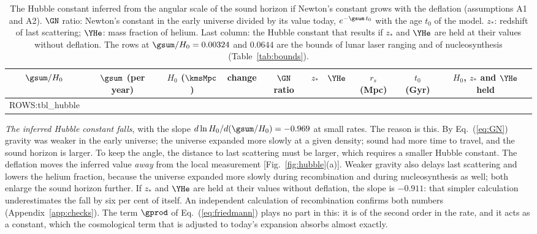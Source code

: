 \begin{table}
\caption{\label{tab:hubble}The Hubble constant inferred from the angular scale of the sound horizon
if Newton's constant grows with the deflation (assumptions A1 and A2). $\GN$ ratio: Newton's constant
in the early universe divided by its value today, $e^{-\gsum\,t_0}$ with the age $t_0$ of the model.
$z_*$: redshift of last scattering; $\YHe$: mass fraction of helium. Last column: the Hubble constant
that results if $z_*$ and $\YHe$ are held at their values without deflation.
The rows at $\gsum/H_0=0.00324$ and $0.0644$ are the bounds of lunar laser ranging and of
nucleosynthesis (Table~\ref{tab:bounds}).}
\begin{ruledtabular}
\begin{tabular}{cccccccccc}
$\gsum/H_0$ & $\gsum$ (per year) & $H_0$ ($\kmsMpc$) & change & $\GN$ ratio & $z_*$ & $\YHe$ & $r_s$ (Mpc) & $t_0$ (Gyr) & $H_0$, $z_*$ and $\YHe$ held \\
\hline
{{ROWS:tbl_hubble}}
\end{tabular}
\end{ruledtabular}
\end{table}

\emph{The inferred Hubble constant falls}, with the slope $d\ln H_0/d(\gsum/H_0)=-0.969$ at small
rates. The reason is this. By Eq.~(\ref{eq:GN}) gravity was weaker in the early universe; the
universe expanded more slowly at a given density; sound had more time to travel, and the sound
horizon is larger. To keep the angle, the distance to last scattering must be larger, which requires
a smaller Hubble constant. The deflation moves the inferred value \emph{away} from the local
measurement [Fig.~\ref{fig:hubble}(a)]. Weaker gravity also delays last scattering and lowers the
helium fraction, because the universe expanded more slowly during recombination and during
nucleosynthesis as well; both enlarge the sound horizon further. If $z_*$ and $\YHe$ are held at
their values without deflation, the slope is $-0.911$: that simpler calculation underestimates the
fall by six per cent of itself. An independent calculation of recombination confirms both numbers
(Appendix~\ref{app:checks}). The term $\gprod$ of Eq.~(\ref{eq:friedmann}) plays no part
in this: it is of the second order in the rate, and it acts as a constant, which the cosmological
term that is adjusted to today's expansion absorbs almost exactly.

